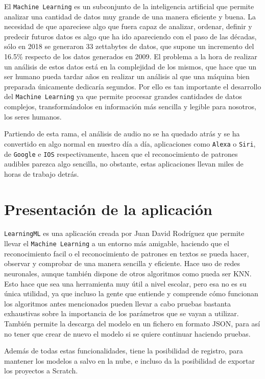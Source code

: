 \documentclass[a4paper, 12pt]{book}
\begin{document}
El \texttt{Machine Learning} es un subconjunto de la inteligencia artificial\cite{zhang2020machine} que permite analizar una cantidad de datos muy grande de una manera eficiente y buena. La necesidad de que apareciese algo que fuera capaz de analizar, ordenar, definir y predecir futuros datos es algo que ha ido apareciendo con el paso de las décadas, sólo en 2018 se generaron 33 zettabytes de datos, que supone un incremento del 16.5\% respecto de los datos generados en 2009\cite{cantidad-datos}. El problema a la hora de realizar un análisis de estos datos está en la complejidad de los mismos, que hace que un ser humano pueda tardar años en realizar un análisis al que una máquina bien preparada únicamente dedicaría segundos. Por ello es tan importante el desarrollo del \texttt{Machine Learning} ya que permite procesar grandes cantidades de datos complejos, transformándolos en información más sencilla y legible para nosotros, los seres humanos.

Partiendo de esta rama, el análisis de audio no se ha quedado atrás y se ha convertido en algo normal en nuestro día a día, aplicaciones como \texttt{Alexa} o \texttt{Siri}, de \texttt{Google} e \texttt{IOS} respectivamente, hacen que el reconocimiento de patrones audibles parezca algo sencilla, no obstante, estas aplicaciones llevan miles de horas de trabajo detrás.

\section{Presentación de la aplicación}
\label{sec:presentacion}

\texttt{LearningML} es una aplicación creada por Juan David Rodríguez que permite llevar el \texttt{Machine Learning} a un entorno más amigable, haciendo que el reconocimiento facil o el reconocimiento de patrones en textos se pueda hacer, observar y comprobar de una manera sencilla y eficiente. Hace uso de redes neuronales, aunque también dispone de otros algoritmos como pueda ser KNN. Esto hace que sea una herramienta muy útil a nivel escolar, pero esa no es su única utilidad, ya que incluso la gente que entiende y comprende cómo funcionan los algoritmos antes mencionados pueden llevar a cabo pruebas bastanta exhaustivas sobre la importancia de los parámetros que se vayan a utilizar. También permite la descarga del modelo en un fichero en formato JSON, para así no tener que crear de nuevo el modelo si se quiere continuar haciendo pruebas.

Además de todas estas funcionalidades, tiene la posibilidad de registro, para mantener los modelos a salvo en la nube, e incluso da la posibilidad de exportar los proyectos a Scratch.
\end{document}
